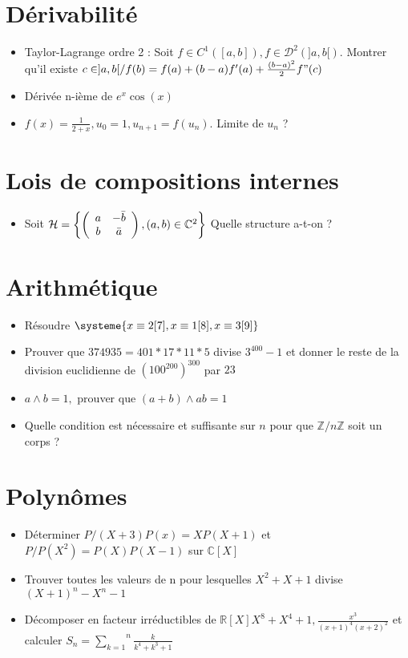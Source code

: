 \documentclass[a4paper, 11pt, french]{article}
\newcommand{\R}{\mathbb{R}}
\newcommand{\C}{\mathbb{C}}
\newcommand{\Z}{\mathbb{Z}}
\newcommand{\p}{\wedge}
\newcommand{\D}{\mathcal{D}}
\newcommand{\som}[2]{\overset{#2}{\underset{#1}{\sum}}}
\newcommand{\inv}[1]{\frac{1}{#1}}
\newcommand{\acc}[1]{\left\{ #1 \right\}}
\begin{document}
	\section*{Dérivabilité}
	\begin{itemize}
 		\item Taylor-Lagrange ordre 2 : Soit $f \in C^1([a,b]), f \in \D^2(]a,b[).$ Montrer qu'il existe ${c \in ]a,b[} / f(b)=f(a)+(b-a)f'(a)+\frac{(b-a)^2}{2}f"(c)$
		\item Dérivée n-ième de $e^x\cos(x)$
		\item $f(x)=\inv{2+x}, u_0=1, u_{n+1}=f(u_n).$ Limite de $u_n$ ?
	\end{itemize}

	\section*{Lois de compositions internes}
	\begin{itemize}
 		\item Soit $\mathcal{H}=\acc{\left( \begin{array}{c c} a & -\bar{b} \\ b & \bar{a} \end{array} \right), (a,b) \in \C^2}$ Quelle structure a-t-on ? 
	\end{itemize}

	\section*{Arithmétique}
	\begin{itemize}
 		\item Résoudre $\systeme{x\equiv 2 [7], x \equiv 1[8], x \equiv 3[9]}$
		\item Prouver que $374 935=401*17*11*5$ divise $3^{400}-1$ et donner le reste de la division euclidienne de $(100^{200})^{300}$ par $23$
		\item $a \p b =1,$ prouver que $(a+b)\p ab=1$
		\item Quelle condition est nécessaire et suffisante sur $n$ pour que $\Z/n\Z$ soit un corps ?
	\end{itemize}

	\section*{Polynômes}
	\begin{itemize}
 		\item Déterminer $P / (X+3)P(x)=XP(X+1)$ et $P / P(X^2)=P(X)P(X-1)$ sur $\C[X]$
 		\item Trouver toutes les valeurs de n pour lesquelles $X^2+X+1$ divise $(X+1)^n-X^n-1$
 		\item Décomposer en facteur irréductibles de $\R[X] X^8+X^4+1, \frac{x^3}{(x+1)^4(x+2)^2}$ et calculer $S_n=\som{k=1}{n}\frac{k}{k^4+k^3+1}$
	\end{itemize}
\end{document}
